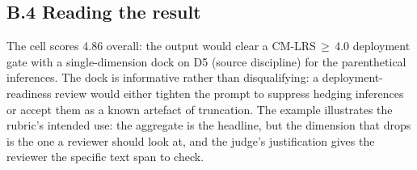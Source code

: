 \documentclass[11pt]{article}
\begin{document}
\subsection*{B.4 Reading the result}

The cell scores 4.86 overall: the output would clear a CM-LRS\,$\geq$\,4.0 deployment gate with a single-dimension dock on D5 (source discipline) for the parenthetical inferences. The dock is informative rather than disqualifying: a deployment-readiness review would either tighten the prompt to suppress hedging inferences or accept them as a known artefact of truncation. The example illustrates the rubric's intended use: the aggregate is the headline, but the dimension that drops is the one a reviewer should look at, and the judge's justification gives the reviewer the specific text span to check.
\end{document}
